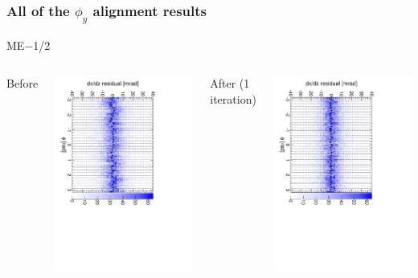 \documentclass[compress]{beamer}
\begin{document}
\begin{frame}
\frametitle{All of the $\phi_y$ alignment results}
\begin{center}
ME$-$1/2
\end{center}

\begin{columns}
\centering Before

\includegraphics[height=\linewidth, angle=90]{iter01_mem12.pdf}

\centering After (1 iteration)

\includegraphics[height=\linewidth, angle=90]{iter02_mem12.pdf}
\end{columns}


\end{frame}
\end{document}
